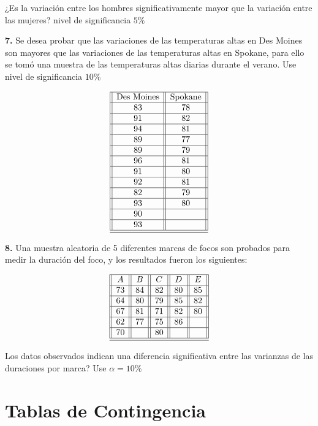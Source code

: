 \documentclass[
  a4paper,
  oneside,
  openany]{book}
\begin{document}
¿Es la variación entre los hombres significativamente mayor que la variación entre las mujeres? nivel de significancia \(5\%\)

\textbf{7.} Se desea probar que las variaciones de las temperaturas altas en Des Moines son mayores que las variaciones de las temperaturas altas en Spokane, para ello se tomó una muestra de las temperaturas altas diarias durante el verano. Use nivel de significancia \(10\%\)

\[
\begin{array}{||c| |c||} 
\hline 
\mbox{Des Moines}& \mbox{Spokane} \\ 
 \hline
83&78\\
 \hline
91&82\\
 \hline
94&81\\
 \hline
89&77\\
 \hline
89&79\\
 \hline
96&81\\
 \hline
91&80\\
 \hline
92&81\\
 \hline
82&79\\
 \hline
93&80\\
 \hline
90&\\
 \hline
93&\\
 \hline
\hline
\end{array}
\]

\textbf{8.} Una muestra aleatoria de 5 diferentes marcas de focos son probados para medir la duración del foco, y los resultados fueron los siguientes:

\[
\begin{array}{||c| |c| |c| |c||c||} 
\hline 
A & B&C&D&E \\ 
 \hline
73&84&82&80&85\\
 \hline
64&80&79&85&82\\
 \hline
67&81&71&82&80\\
 \hline
62&77&75&86&\\
 \hline
70&&80&&\\
\hline
\hline
\end{array}
\]

Los datos observados indican una diferencia significativa entre las varianzas de las duraciones por marca? Use \(\alpha=10\%\)

\hypertarget{part-tablas-de-contingencia}{%
\part{Tablas de Contingencia}\label{part-tablas-de-contingencia}}
\end{document}
